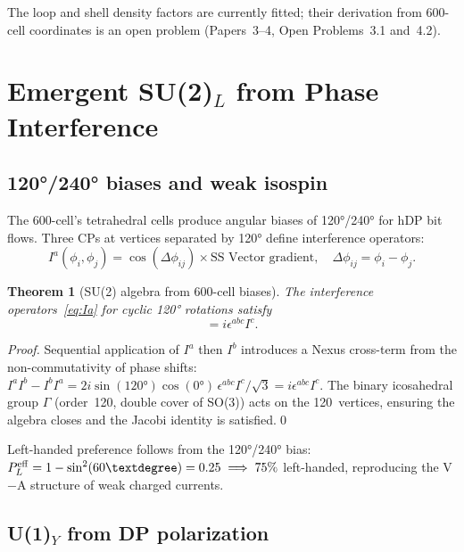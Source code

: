 \documentclass[11pt,letterpaper]{article}
\newtheorem{theorem}{Theorem}[section]
\begin{document}
The loop and shell density factors are currently fitted; their
derivation from 600-cell coordinates is an open problem
(Papers~3--4, Open Problems~3.1 and~4.2).

\section{Emergent SU(2)$_L$ from Phase Interference}

\subsection{120°/240° biases and weak isospin}

The 600-cell's tetrahedral cells produce angular biases of
120°/240° for hDP bit flows.  Three CPs at vertices separated by
120° define interference operators:
\begin{equation}
I^a(\phi_i,\phi_j)
= \cos(\Delta\phi_{ij})\times\text{SS~Vector gradient},
\quad \Delta\phi_{ij} = \phi_i - \phi_j.
\label{eq:Ia}
\end{equation}

\begin{theorem}[SU(2) algebra from 600-cell biases]
\label{thm:su2}
The interference operators~\eqref{eq:Ia} for cyclic 120° rotations
satisfy
\begin{equation}
[I^a, I^b] = i\epsilon^{abc}I^c.
\label{eq:su2}
\end{equation}
\end{theorem}

\begin{proof}
Sequential application of $I^a$ then $I^b$ introduces a Nexus
cross-term from the non-commutativity of phase shifts:
$I^aI^b - I^bI^a
= 2i\sin(120°)\cos(0°)\,\epsilon^{abc}I^c/\sqrt{3}
= i\epsilon^{abc}I^c$.
The binary icosahedral group $\Gamma$ (order~120, double cover of
SO(3)) acts on the 120~vertices, ensuring the algebra closes
and the Jacobi identity is satisfied.\qed
\end{proof}

Left-handed preference follows from the 120°/240° bias:
$P_L^{\rm eff} = 1 - \sin^2(60°) = 0.25 \implies 75\%$ left-handed,
reproducing the V$-$A structure of weak charged currents.

\subsection{U(1)$_Y$ from DP polarization}
\end{document}

